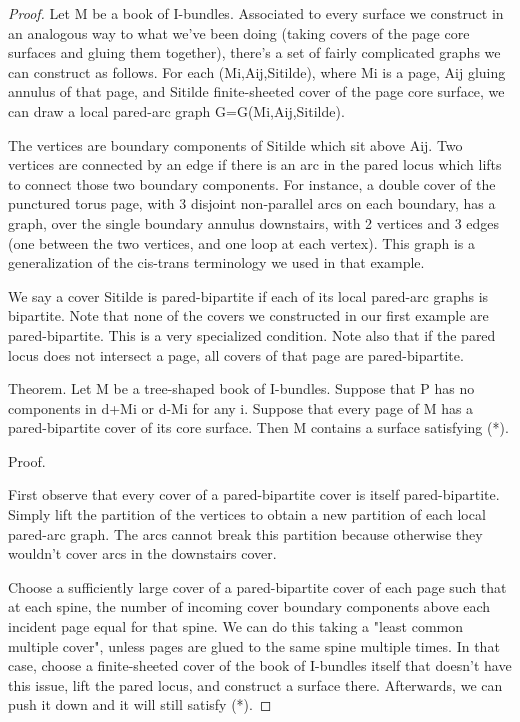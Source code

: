 \documentclass[12pt]{amsart}
\theoremstyle{definition}
\begin{document}
\begin{proof}
Let M be a book of I-bundles. Associated to every surface we construct in an
analogous way to what we've been doing (taking covers of the page core surfaces
and gluing them together), there's a set of fairly complicated graphs we can
construct as follows. For each (Mi,Aij,Sitilde), where Mi is a page, Aij gluing
annulus of that page, and Sitilde finite-sheeted cover of the page core
surface, we can draw a local pared-arc graph G=G(Mi,Aij,Sitilde).

The vertices are boundary components of Sitilde which sit above Aij. Two
vertices are connected by an edge if there is an arc in the pared locus which
lifts to connect those two boundary components. For instance, a double cover of
the punctured torus page, with 3 disjoint non-parallel arcs on each boundary,
has a graph, over the single boundary annulus downstairs,  with 2 vertices and
3 edges (one between the two vertices, and one loop at each vertex). This graph
is a generalization of the cis-trans terminology we used in that example.

We say a cover Sitilde is pared-bipartite if each of its local pared-arc
graphs is bipartite. Note that none of the covers we constructed in our first
example are pared-bipartite. This is a very specialized condition. Note also
that if the pared locus does not intersect a page, all covers of that page are
pared-bipartite.

Theorem. Let M be a tree-shaped book of I-bundles. Suppose that P has no
components in d+Mi or d-Mi for any i. Suppose that every page of M has
a pared-bipartite cover of its core surface. Then M contains a surface
satisfying (*).

Proof.

First observe that every cover of a pared-bipartite cover is itself
pared-bipartite. Simply lift the partition of the vertices to obtain a new
partition of each local pared-arc graph. The arcs cannot break this
partition because otherwise they wouldn't cover arcs in the downstairs cover.

Choose a sufficiently large cover of a pared-bipartite cover of each page such
that at each spine, the number of incoming cover boundary components above each
incident page equal for that spine. We can do this taking a "least common
multiple cover", unless pages are glued to the same spine multiple times. In
that case, choose a finite-sheeted cover of the book of I-bundles itself that
doesn't have this issue, lift the pared locus, and construct a surface there.
Afterwards, we can push it down and it will still satisfy (*).


\end{proof}
\end{document}
